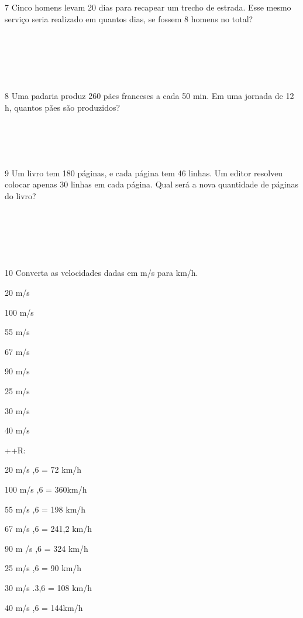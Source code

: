 \num{7} Cinco homens levam 20 dias para recapear um trecho de estrada. Esse
mesmo serviço seria realizado em quantos dias, se fossem 8 homens no
total?

\\
\\
\\
\\
\\

\num{8} Uma padaria produz 260 pães franceses a cada 50 min. Em uma jornada
de 12 h, quantos pães são produzidos?

\\
\\
\\
\\

\num{9} Um livro tem 180 páginas, e cada página tem 46 linhas. Um editor
resolveu colocar apenas 30 linhas em cada página. Qual será a nova
quantidade de páginas do livro?

\\
\\
\\
\\
\\

\num{10} Converta as velocidades dadas em m/s para km/h.
\item 20 m/s
\item 100 m/s
\item 55 m/s
\item 67 m/s
\item 90 m/s
\item 25 m/s
\item 30 m/s
\item 40 m/s

++R:
\item 20 m/s ,6 = 72 km/h
\item 100 m/s ,6 = 360km/h
\item 55 m/s ,6 = 198 km/h
\item 67 m/s ,6 = 241,2 km/h
\item 90 m /s ,6 = 324 km/h
\item 25 m/s ,6 = 90 km/h
\item 30 m/s .3,6 = 108 km/h
\item 40 m/s ,6 = 144km/h

